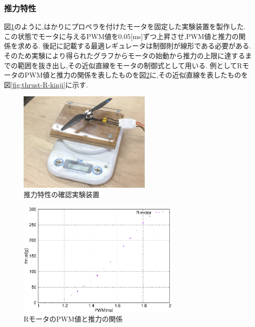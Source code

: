 \documentclass[12pt,oneside]{sotsuken_paper}
\begin{document}
\subsubsection{推力特性}
図\ref{fig:thrust-test}のように,はかりにプロペラを付けたモータを固定した実験装置を製作した.
この状態でモータに与えるPWM値を0.05[ms]ずつ上昇させ,PWM値と推力の関係を求める.
後記に記載する最適レギュレータは制御則が線形である必要がある.
そのため実験により得られたグラフからモータの始動から推力の上限に達するまでの範囲を抜き出し,その近似直線をモータの制御式として用いる.
例としてRモータのPWM値と推力の関係を表したものを図\ref{fig:thrust-R}に,その近似直線を表したものを図\ref{fig:thrust-R-kinji}に示す.

\begin{figure}[htbp]
	\begin{center}
		\includegraphics[width=65mm]{image/thrust/thrust-test.jpg}
		\caption{推力特性の確認実験装置}
		\label{fig:thrust-test}
	\end{center}
\end{figure}

\begin{figure}[htbp]
	\begin{center}
		\includegraphics[width=80mm]{image/thrust/thrust-R.eps}
		\caption{RモータのPWM値と推力の関係}
		\label{fig:thrust-R}
	\end{center}
\end{figure}
\end{document}
